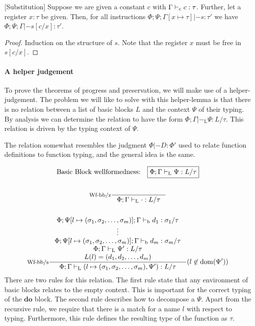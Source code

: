 \documentclass[a4paper, oneside, 10pt, draft]{memoir}
\begin{document}
\begin{lem}{[Substitution]}
  \label{lem:substitution}
  Suppose we are given a constant $c$ with $\Gamma |-_{\mathrm{c}} c :
  \tau$. Further, let a register $x : \tau$ be given. Then, for all
  instructions $\Phi;\Psi;\Gamma[x \mapsto \tau] |- s : \tau'$ we have
  $\Phi;\Psi;\Gamma |- s[c/x] : \tau'$.
\end{lem}
\begin{proof}
  Induction on the structure of $s$. Note that the register $x$ must
  be free in $s[c/x]$.
\end{proof}

\paragraph{A helper judgement}

\newcommand{\tpbb}{|-_{\mathrm{L}}}
To prove the theorems of progress and preservation, we will make use
of a helper-judgement. The problem we will like to solve with this
helper-lemma is that there is no relation between a list of basic
blocks $L$ and the context $\Psi$ of their typing. By analysis we can
determine the relation to have the form $\boxed{\Phi;\Gamma \tpbb \Psi :
  L / \tau}$. This relation is driven by the typing context of $\Psi$.

The relation somewhat resembles the judgment $\Phi |- D : \Phi'$ used
to relate function definitions to function typing, and the general
idea is the same.

\begin{gather*}
  \text{Basic Block wellformedness:} \quad \boxed{\Phi;\Gamma \tpbb
    \Psi : L / \tau}\\\\
  \inference[Wf-bb/z]{}{\Phi;\Gamma \tpbb \cdot : L / \tau}\\\\
  \inference[Wf-bb/s]{\Phi;\Psi[l\mapsto \sbundle];\Gamma \tpb d_1 :  \sigma_1 / \tau\\
  \vdots\\
  \Phi;\Psi[l\mapsto \sbundle];\Gamma \tpb d_m : \sigma_m / \tau\\
  \Phi;\Gamma \tpbb \Psi' : L / \tau\\
  L(l) = \dbundle}
  {\Phi;\Gamma \tpbb (l \mapsto \sbundle, \Psi') : L / \tau}(l \not \in \dom{\Psi'})
\end{gather*}
There are two rules for this relation. The first rule state that any
environment of basic blocks relates to the empty context. This is
important for the correct typing of the $\mathbf{do}$ block. The
second rule describes how to decompose a $\Psi$. Apart from the
recursive rule, we require that there is a match for a name $l$ with
respect to typing. Furthermore, this rule defines the resulting type
of the function as $\tau$.
\end{document}

